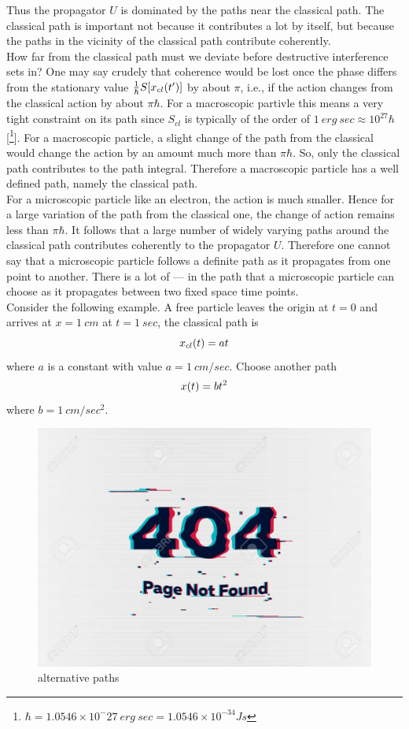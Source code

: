 	
	
	Thus the propagator $U$ is dominated by the paths near the classical path. The classical path is important not because it contributes a lot by itself, but because the paths in the vicinity of the classical path contribute coherently.\\
	
	
	How far from the classical path must we deviate before destructive interference sets in? One may say crudely that coherence would be lost once the phase differs from the stationary value $\frac{1}{\hbar} S\qty[x_{cl}(t^\prime)]$ by about $\pi$, i.e., if the action changes from the classical action by about $\pi \hbar$. For a macroscopic partivle this means a very tight constraint on its path since $S_{cl}$ is typically of the order of $1\ erg\ sec \approx 10^{27} \hbar$[\footnote{$\hbar = 1.0546 \times 10^-27 \ erg\ sec = 1.0546 \times 10^{-34} J s$}]. For a macroscopic particle, a slight change of the path from the classical would change the action by an amount much more than $\pi \hbar$. So, only the classical path contributes to the path integral. Therefore a macroscopic particle has a well defined path, namely the classical path. \\
	
	
	For a microscopic particle like an electron, the action is much smaller. Hence for a large variation of the path from the classical one, the change of action remains less than $\pi \hbar$. It follows that a large number of widely varying paths around the classical path contributes coherently to the propagator $U$. Therefore one cannot say that a microscopic particle follows a definite path as it propagates from one point to another. There is  a lot of --- in the path that a microscopic particle can choose as it propagates between two fixed space time points.\\
	
	
	Consider the following example. A free particle leaves the origin at $t=0$ and arrives at $x=1\ cm$ at $t= 1 \ sec$, the classical path is 
	\begin{equation}
		x_{cl}\qty(t) = a t
	\end{equation}
	where $a$ is a constant with value $a=1\ cm/sec$. Choose another path
	\begin{equation}
		x\qty(t) = b t^2
	\end{equation}
	where $b= 1\ cm/sec^2$.
	
	
	\begin{figure}
		\centering
		\includegraphics[width=0.5\linewidth]{Pictures/not-found.jpg}
		\caption{alternative paths}
	\end{figure}

